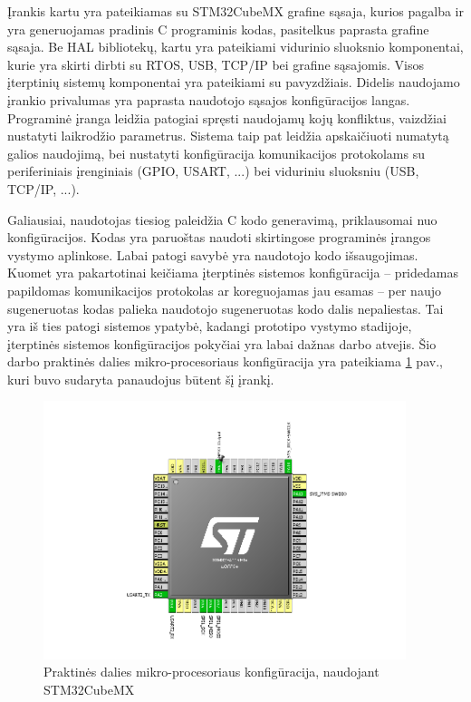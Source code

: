 Įrankis kartu yra pateikiamas su STM32CubeMX grafine sąsaja, kurios pagalba ir yra generuojamas pradinis C programinis kodas,
pasitelkus paprasta grafine sąsaja.
Be HAL bibliotekų, kartu yra pateikiami vidurinio sluoksnio komponentai, kurie yra skirti dirbti su RTOS, USB, TCP/IP bei grafine sąsajomis.
Visos įterptinių sistemų komponentai yra pateikiami su pavyzdžiais.
Didelis naudojamo įrankio privalumas yra paprasta naudotojo sąsajos konfigūracijos langas.
Programinė įranga leidžia patogiai spręsti naudojamų kojų konfliktus, vaizdžiai nustatyti laikrodžio parametrus.
Sistema taip pat leidžia apskaičiuoti numatytą galios naudojimą, bei nustatyti konfigūracija komunikacijos protokolams su periferiniais įrenginiais (GPIO, USART, ...) bei viduriniu sluoksniu (USB, TCP/IP, ...).

Galiausiai, naudotojas tiesiog paleidžia C kodo generavimą, priklausomai nuo konfigūracijos.
Kodas yra paruoštas naudoti skirtingose programinės įrangos vystymo aplinkose.
Labai patogi savybė yra naudotojo kodo išsaugojimas.
Kuomet yra pakartotinai keičiama įterptinės sistemos konfigūracija -- pridedamas papildomas komunikacijos protokolas ar koreguojamas jau esamas -- per naujo sugeneruotas kodas palieka naudotojo sugeneruotas kodo dalis nepaliestas.
Tai yra iš ties patogi sistemos ypatybė, kadangi prototipo vystymo stadijoje, įterptinės sistemos konfigūracijos pokyčiai yra labai dažnas darbo atvejis.
Šio darbo praktinės dalies mikro-procesoriaus konfigūracija yra pateikiama \ref{fig:stm32_cube_mx} pav., kuri buvo sudaryta panaudojus būtent šį įrankį.

\begin{figure}[H]
    \centering
    \includegraphics[width=400px]{img/cubemx.png}
    \caption{Praktinės dalies mikro-procesoriaus konfigūracija, naudojant STM32CubeMX \cite{STM3293:online}}
    \label{fig:stm32_cube_mx}
\end{figure}

